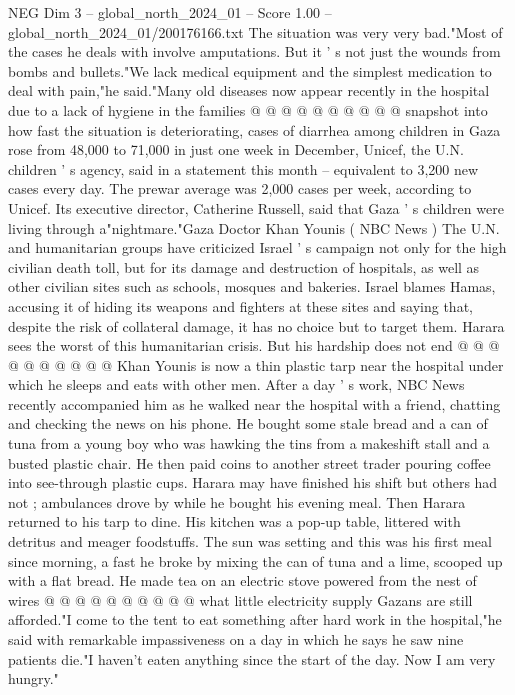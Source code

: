 \begin{textsample}{NEG Dim 3 – global\_north\_2024\_01 – Score 1.00 – global\_north\_2024\_01/200176166.txt}
The situation was very very bad."Most of the cases he deals with involve amputations.
But it ' s not just the wounds from bombs and bullets."We lack medical equipment and the simplest medication to deal with pain,"he said."Many old diseases now appear recently in the hospital due to a lack of hygiene in the families @ @ @ @ @ @ @ @ @ @ snapshot into how fast the situation is deteriorating, cases of diarrhea among children in Gaza rose from 48,000 to 71,000 in just one week in December, Unicef, the U.N. children ' s agency, said in a statement this month -- equivalent to 3,200 new cases every day.
The prewar average was 2,000 cases per week, according to Unicef.
Its executive director, Catherine Russell, said that Gaza ' s children were living through a"nightmare."Gaza Doctor Khan Younis ( NBC News ) The U.N. and humanitarian groups have criticized Israel ' s campaign not only for the high civilian death toll, but for its damage and destruction of hospitals, as well as other civilian sites such as schools, mosques and bakeries.
Israel blames Hamas, accusing it of hiding its weapons and fighters at these sites and saying that, despite the risk of collateral damage, it has no choice but to target them.
Harara sees the worst of this humanitarian crisis.
But his hardship does not end @ @ @ @ @ @ @ @ @ @ Khan Younis is now a thin plastic tarp near the hospital under which he sleeps and eats with other men.
After a day ' s work, NBC News recently accompanied him as he walked near the hospital with a friend, chatting and checking the news on his phone.
He bought some stale bread and a can of tuna from a young boy who was hawking the tins from a makeshift stall and a busted plastic chair.
He then paid coins to another street trader pouring coffee into see-through plastic cups.
Harara may have finished his shift but others had not ; ambulances drove by while he bought his evening meal.
Then Harara returned to his tarp to dine.
His kitchen was a pop-up table, littered with detritus and meager foodstuffs.
The sun was setting and this was his first meal since morning, a fast he broke by mixing the can of tuna and a lime, scooped up with a flat bread.
He made tea on an electric stove powered from the nest of wires @ @ @ @ @ @ @ @ @ @ what little electricity supply Gazans are still afforded."I come to the tent to eat something after hard work in the hospital,"he said with remarkable impassiveness on a day in which he says he saw nine patients die."I haven't eaten anything since the start of the day.
Now I am very hungry."

\end{textsample}

